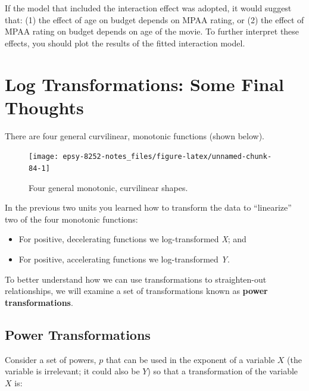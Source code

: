 \documentclass[]{book}
\providecommand{\tightlist}{%
  \setlength{\itemsep}{0pt}\setlength{\parskip}{0pt}}
\begin{document}
If the model that included the interaction effect was adopted, it would suggest that: (1) the effect of age on budget depends on MPAA rating, or (2) the effect of MPAA rating on budget depends on age of the movie. To further interpret these effects, you should plot the results of the fitted interaction model.

\hypertarget{log-transformations-some-final-thoughts}{%
\chapter*{Log Transformations: Some Final Thoughts}\label{log-transformations-some-final-thoughts}}

There are four general curvilinear, monotonic functions (shown below).

\begin{figure}

{\centering \texttt{[image: epsy-8252-notes\_files/figure-latex/unnamed-chunk-84-1]} 

}

\caption{Four general monotonic, curvilinear shapes.}\label{fig:unnamed-chunk-84}
\end{figure}

In the previous two units you learned how to transform the data to ``linearize'' two of the four monotonic functions:

\begin{itemize}
\tightlist
\item
  For positive, decelerating functions we log-transformed \emph{X}; and
\item
  For positive, accelerating functions we log-transformed \emph{Y}.
\end{itemize}

To better understand how we can use transformations to straighten-out relationships, we will examine a set of transformations known as \textbf{power transformations}.

\hypertarget{power-transformations}{%
\section*{Power Transformations}\label{power-transformations}}

Consider a set of powers, \(p\) that can be used in the exponent of a variable \(X\) (the variable is irrelevant; it could also be \(Y\)) so that a transformation of the variable \(X\) is:
\end{document}
